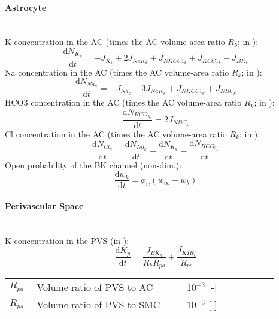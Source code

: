\paragraph{Astrocyte}~\\
%
\gls{K} concentration in the AC  (times the AC volume-area ratio $R_k$; in \uMm):
\begin{equation} \label{eq:KInt}
\dfrac{\mathrm{d}N_{K_k}}{\mathrm{d}t}=- J_{K_k} + 2 J_{NaK_{k}} + J_{NKCC1_{k}} +  J_{KCC1_{k}}
- J_{BK_k}  
\end{equation}
%
\gls{Na} concentration in the AC  (times the AC volume-area ratio $R_k$; in \uMm):
\begin{equation} \label{eq:NaInt}
\dfrac{\mathrm{d}N_{Na_k}}{\mathrm{d}t}=-J_{Na_k} - 3 J_{NaK_{k}} + J_{NKCC1_{k}} +  J_{NBC_{k}}
\end{equation}
%
\gls{HCO3} concentration in the AC  (times the AC volume-area ratio $R_k$; in \uMm):
\begin{equation} \label{eq:HCOInt}
\dfrac{\mathrm{d}N_{HCO_{3_k}}}{\mathrm{d}t}= 2 J_{NBC_{k}} 
\end{equation}
%
\gls{Cl} concentration in the AC  (times the AC volume-area ratio $R_k$; in \uMm):
\begin{equation} \label{eq:ClInt}
\dfrac{\mathrm{d}N_{Cl_k}}{\mathrm{d}t}= \dfrac{\mathrm{d}N_{Na_k}}{\mathrm{d}t} + \dfrac{\mathrm{d}N_{K_k}}{\mathrm{d}t} - \dfrac{\mathrm{d}N_{HCO_{3_{k}}}}{\mathrm{d}t}
\end{equation}
%
Open probability of the BK channel (non-dim.):
\begin{equation} \label{eq:dwkdt}
\frac{\mathrm{d}w_{k}}{\mathrm{d}t} = \phi_{w} \left(w_{\infty}-w_{k} \right) 
\end{equation}
%
\paragraph{Perivascular Space}~\\
\gls{K} concentration in the PVS  (in \uM):
\begin{equation} \label{eq:K_p}
\dfrac{\mathrm{d}K_{p}}{\mathrm{d}t}= \frac{J_{BK_k}}{R_k R_{pa}} + \frac{J_{KIR_i}}{ R_{ps}}
\end{equation}
%
\begin{table}[h!]
\centering
\begin{tabular}{ p{0.09\linewidth}  >{\footnotesize} p{0.5\linewidth}  >{\footnotesize} p{0.27\linewidth} >{\footnotesize} p{0.03\linewidth} }
\hline
$ R_{pa} $  & Volume ratio of PVS to AC & 10$^{-3}$ [-] & \cite{Nagelhus1999} \\
$ R_{ps} $  & Volume ratio of PVS to SMC & 10$^{-3}$ [-] & \cite{Nagelhus1999} \\
\hline
\end{tabular}
\end{table}
